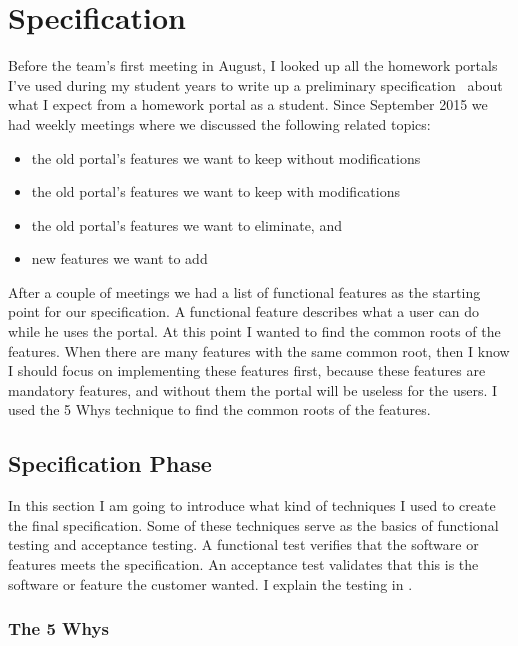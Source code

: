\chapter{Specification}\label{specification}

Before the team's first meeting in August, I looked up all the homework portals I've used during my student years to write up a preliminary specification~\cite{Szepes-specification} about what I expect from a homework portal as a student. Since September 2015 we had weekly meetings where we discussed the following related topics: 

\begin{itemize}
	\item the old portal's features we want to keep without modifications
	\item the old portal's features we want to keep with modifications
	\item the old portal's features we want to eliminate, and
	\item new features we want to add
\end{itemize}

After a couple of meetings we had a list of functional features as the starting point for our specification. A functional feature describes what a user can do while he uses the portal. At this point I wanted to find the common roots of the features. When there are many features with the same common root, then I know I should focus on implementing these features first, because these features are mandatory features, and without them the portal will be useless for the users. I used the 5 Whys technique to find the common roots of the features. 

\section{Specification Phase}\label{spec-phase}
In this section I am going to introduce what kind of techniques I used to create the final specification. Some of these techniques serve as the basics of functional testing and acceptance testing. A functional test verifies that the software or features meets the specification. An acceptance test validates that this is the software or feature the customer wanted. I explain the testing in . 

\subsection{The 5 Whys}
\label{5-whys}

